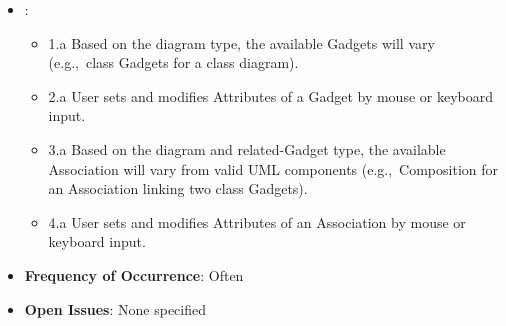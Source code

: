 \documentclass[12pt]{article}
\begin{document}
\begin{itemize}
        \item {}:
        \begin{itemize}
            \item 1.a Based on the diagram type, the available Gadgets will vary (e.g.,\ class Gadgets for a class diagram).
            \item 2.a User sets and modifies Attributes of a Gadget by mouse or keyboard input.
            \item 3.a Based on the diagram and related-Gadget type, the available Association will vary from valid UML components (e.g.,\ Composition for an Association linking two class Gadgets).
            \item 4.a User sets and modifies Attributes of an Association by mouse or keyboard input.
        \end{itemize}
        \item \textbf{Frequency of Occurrence}: Often
        \item \textbf{Open Issues}: None specified
    \end{itemize}
\end{document}
